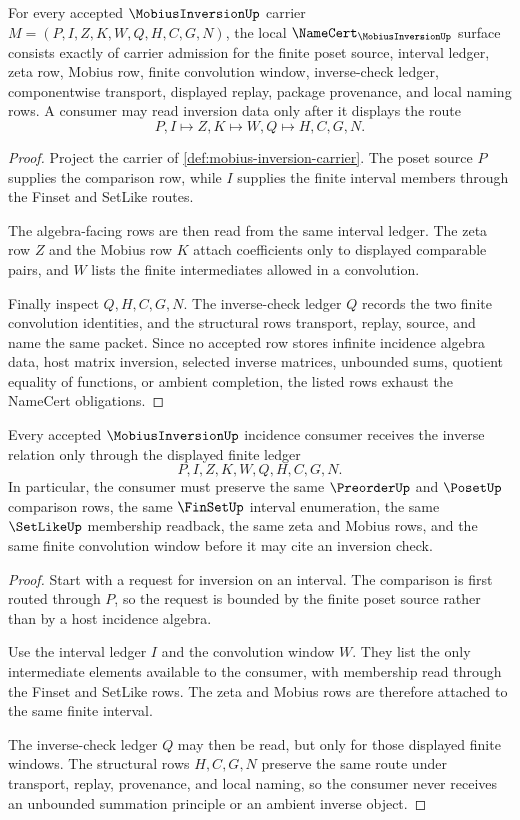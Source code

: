 \begin{theorem}
\label{thm:mobius-inversion-namecert-obligations}
For every accepted $\MobiusInversionUp$ carrier $M=(P,I,Z,K,W,Q,H,C,G,N)$, the local $\NameCert_{\MobiusInversionUp}$ surface consists exactly of carrier admission for the finite poset source, interval ledger, zeta row, Mobius row, finite convolution window, inverse-check ledger, componentwise transport, displayed replay, package provenance, and local naming rows. A consumer may read inversion data only after it displays the route
$$
P,I \longmapsto Z,K \longmapsto W,Q \longmapsto H,C,G,N .
$$
\end{theorem}
\begin{proof}
Project the carrier of \autoref{def:mobius-inversion-carrier}. The poset source $P$ supplies the comparison row, while $I$ supplies the finite interval members through the Finset and SetLike routes.

The algebra-facing rows are then read from the same interval ledger. The zeta row $Z$ and the Mobius row $K$ attach coefficients only to displayed comparable pairs, and $W$ lists the finite intermediates allowed in a convolution.

Finally inspect $Q,H,C,G,N$. The inverse-check ledger $Q$ records the two finite convolution identities, and the structural rows transport, replay, source, and name the same packet. Since no accepted row stores infinite incidence algebra data, host matrix inversion, selected inverse matrices, unbounded sums, quotient equality of functions, or ambient completion, the listed rows exhaust the NameCert obligations.
\end{proof}

\begin{theorem}
\label{thm:mobius-inversion-incidence-ledger}
Every accepted $\MobiusInversionUp$ incidence consumer receives the inverse relation only through the displayed finite ledger
$$
P,I,Z,K,W,Q,H,C,G,N .
$$
In particular, the consumer must preserve the same $\PreorderUp$ and $\PosetUp$ comparison rows, the same $\FinSetUp$ interval enumeration, the same $\SetLikeUp$ membership readback, the same zeta and Mobius rows, and the same finite convolution window before it may cite an inversion check.
\end{theorem}
\begin{proof}
Start with a request for inversion on an interval. The comparison is first routed through $P$, so the request is bounded by the finite poset source rather than by a host incidence algebra.

Use the interval ledger $I$ and the convolution window $W$. They list the only intermediate elements available to the consumer, with membership read through the Finset and SetLike rows. The zeta and Mobius rows are therefore attached to the same finite interval.

The inverse-check ledger $Q$ may then be read, but only for those displayed finite windows. The structural rows $H,C,G,N$ preserve the same route under transport, replay, provenance, and local naming, so the consumer never receives an unbounded summation principle or an ambient inverse object.
\end{proof}


